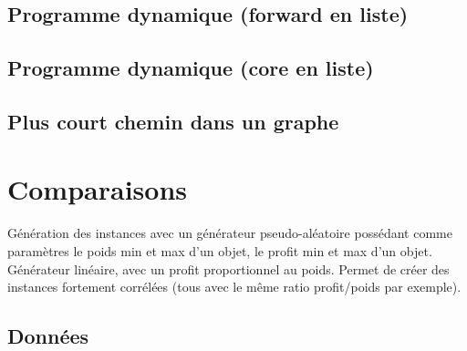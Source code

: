 \documentclass[12pt]{article}
\begin{document}
\paragraph{}

\subsection{Programme dynamique (forward en liste)}

\paragraph{}

\subsection{Programme dynamique (core en liste)}

\paragraph{}

\subsection{Plus court chemin dans un graphe}

\paragraph{}

\section{Comparaisons}

\paragraph{}Génération des instances avec un générateur pseudo-aléatoire possédant comme paramètres le poids min et max d'un objet, le profit min et max d'un objet. Générateur linéaire, avec un profit proportionnel au poids. Permet de créer des instances fortement corrélées (tous avec le même ratio profit/poids par exemple).

\subsection{Données}
\end{document}
